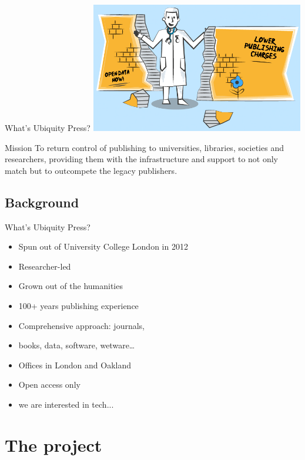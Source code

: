 \documentclass[xcolor=svgnames]{beamer}
\begin{document}
        \begin{frame}{What's Ubiquity Press?}
            \includegraphics[width=0.7\textwidth]{img/up_banner}
            \begin{block}{Mission}
                To return control of publishing to universities, libraries, societies and researchers, providing them with the infrastructure and support to not only match but to outcompete the legacy publishers.
            \end{block}
        \end{frame}

    \subsection{Background}

        \begin{frame}{What's Ubiquity Press?}
            \begin{itemize}
                \item Spun out of University College London in 2012
                \item Researcher-led
                \item Grown out of the humanities
                \item 100+ years publishing experience
                \item Comprehensive approach: journals,
                \item books, data, software, wetware…
                \item Offices in London and Oakland
                \item Open access only
                \item we are interested in tech...
            \end{itemize}
        \end{frame}

\section{The project}
\end{document}

